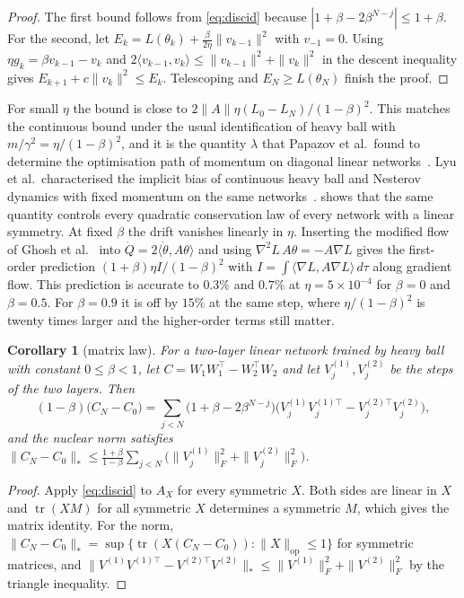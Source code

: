 \documentclass[11pt]{article}
\newtheorem{corollary}[theorem]{Corollary}
\theoremstyle{remark}
\theoremstyle{definition}
\newcommand{\ip}[2]{\langle #1,#2\rangle}
\begin{document}
\begin{proof}
The first bound follows from \eqref{eq:discid} because $|1+\beta-2\beta^{N-j}|\le1+\beta$. For the second, let $E_k=L(\theta_k)+\frac{\beta}{2\eta}\|v_{k-1}\|^2$ with $v_{-1}=0$. Using $\eta g_k=\beta v_{k-1}-v_k$ and $2\ip{v_{k-1}}{v_k}\le\|v_{k-1}\|^2+\|v_k\|^2$ in the descent inequality gives $E_{k+1}+c\|v_k\|^2\le E_k$. Telescoping and $E_N\ge L(\theta_N)$ finish the proof.
\end{proof}

For small $\eta$ the bound is close to $2\|A\|\eta(L_0-L_N)/(1-\beta)^2$. This matches the continuous bound under the usual identification of heavy ball with $m/\gamma^2=\eta/(1-\beta)^2$, and it is the quantity $\lambda$ that Papazov et al.\ found to determine the optimisation path of momentum on diagonal linear networks~\cite{papazov2024}. Lyu et al.\ characterised the implicit bias of continuous heavy ball and Nesterov dynamics with fixed momentum on the same networks~\cite{lyu2025}.  shows that the same quantity controls every quadratic conservation law of every network with a linear symmetry. At fixed $\beta$ the drift vanishes linearly in $\eta$. Inserting the modified flow of Ghosh et al.~\cite[eq.~(4)]{ghosh2023} into $\dot Q=2\ip{\dot\theta}{A\theta}$ and using $\nabla^2L\,A\theta=-A\nabla L$ gives the first-order prediction $(1+\beta)\eta I/(1-\beta)^2$ with $I=\int\ip{\nabla L}{A\nabla L}\,d\tau$ along gradient flow. This prediction is accurate to $0.3\%$ and $0.7\%$ at $\eta=5\times10^{-4}$ for $\beta=0$ and $\beta=0.5$. For $\beta=0.9$ it is off by $15\%$ at the same step, where $\eta/(1-\beta)^2$ is twenty times larger and the higher-order terms still matter.

\begin{corollary}[matrix law]\label{cor:matrix}
For a two-layer linear network trained by heavy ball with constant $0\le\beta<1$, let $C=W_1W_1^\top-W_2^\top W_2$ and let $V^{(1)}_j,V^{(2)}_j$ be the steps of the two layers. Then
\[
(1-\beta)\bigl(C_N-C_0\bigr)=\sum_{j<N}\bigl(1+\beta-2\beta^{N-j}\bigr)\bigl(V^{(1)}_jV^{(1)\top}_j-V^{(2)\top}_jV^{(2)}_j\bigr),
\]
and the nuclear norm satisfies $\|C_N-C_0\|_*\le\frac{1+\beta}{1-\beta}\sum_{j<N}\bigl(\|V^{(1)}_j\|_F^2+\|V^{(2)}_j\|_F^2\bigr)$.
\end{corollary}

\begin{proof}
Apply \eqref{eq:discid} to $A_X$ for every symmetric $X$. Both sides are linear in $X$ and $\operatorname{tr}(XM)$ for all symmetric $X$ determines a symmetric $M$, which gives the matrix identity. For the norm, $\|C_N-C_0\|_*=\sup\{\operatorname{tr}(X(C_N-C_0)):\|X\|_{\mathrm{op}}\le1\}$ for symmetric matrices, and $\|V^{(1)}V^{(1)\top}-V^{(2)\top}V^{(2)}\|_*\le\|V^{(1)}\|_F^2+\|V^{(2)}\|_F^2$ by the triangle inequality.
\end{proof}
\end{document}
